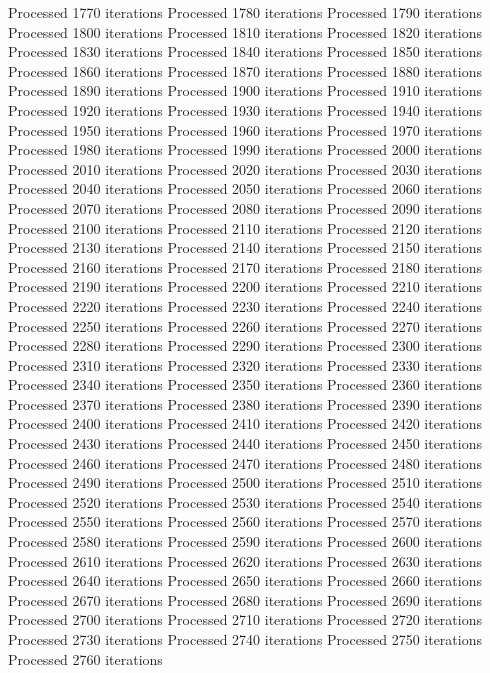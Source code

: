 \begin{pyprint}
Processed 1770 iterations
Processed 1780 iterations
Processed 1790 iterations
Processed 1800 iterations
Processed 1810 iterations
Processed 1820 iterations
Processed 1830 iterations
Processed 1840 iterations
Processed 1850 iterations
Processed 1860 iterations
Processed 1870 iterations
Processed 1880 iterations
Processed 1890 iterations
Processed 1900 iterations
Processed 1910 iterations
Processed 1920 iterations
Processed 1930 iterations
Processed 1940 iterations
Processed 1950 iterations
Processed 1960 iterations
Processed 1970 iterations
Processed 1980 iterations
Processed 1990 iterations
Processed 2000 iterations
Processed 2010 iterations
Processed 2020 iterations
Processed 2030 iterations
Processed 2040 iterations
Processed 2050 iterations
Processed 2060 iterations
Processed 2070 iterations
Processed 2080 iterations
Processed 2090 iterations
Processed 2100 iterations
Processed 2110 iterations
Processed 2120 iterations
Processed 2130 iterations
Processed 2140 iterations
Processed 2150 iterations
Processed 2160 iterations
Processed 2170 iterations
Processed 2180 iterations
Processed 2190 iterations
Processed 2200 iterations
Processed 2210 iterations
Processed 2220 iterations
Processed 2230 iterations
Processed 2240 iterations
Processed 2250 iterations
Processed 2260 iterations
Processed 2270 iterations
Processed 2280 iterations
Processed 2290 iterations
Processed 2300 iterations
Processed 2310 iterations
Processed 2320 iterations
Processed 2330 iterations
Processed 2340 iterations
Processed 2350 iterations
Processed 2360 iterations
Processed 2370 iterations
Processed 2380 iterations
Processed 2390 iterations
Processed 2400 iterations
Processed 2410 iterations
Processed 2420 iterations
Processed 2430 iterations
Processed 2440 iterations
Processed 2450 iterations
Processed 2460 iterations
Processed 2470 iterations
Processed 2480 iterations
Processed 2490 iterations
Processed 2500 iterations
Processed 2510 iterations
Processed 2520 iterations
Processed 2530 iterations
Processed 2540 iterations
Processed 2550 iterations
Processed 2560 iterations
Processed 2570 iterations
Processed 2580 iterations
Processed 2590 iterations
Processed 2600 iterations
Processed 2610 iterations
Processed 2620 iterations
Processed 2630 iterations
Processed 2640 iterations
Processed 2650 iterations
Processed 2660 iterations
Processed 2670 iterations
Processed 2680 iterations
Processed 2690 iterations
Processed 2700 iterations
Processed 2710 iterations
Processed 2720 iterations
Processed 2730 iterations
Processed 2740 iterations
Processed 2750 iterations
Processed 2760 iterations

\end{pyprint}
